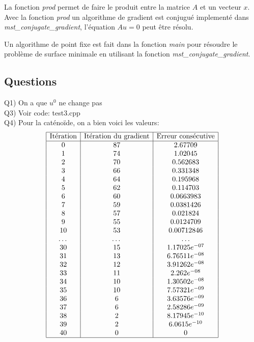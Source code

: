 \documentclass[a4paper, 11pt]{article}
\begin{document}
La fonction \textit{prod} permet de faire le produit entre la matrice $A$ et un
 vecteur $x$. Avec la fonction \textit{prod} un algorithme de gradient
 est conjugu\'e implement\'e dans \textit{mst\_conjugate\_gradient},
 l'\'equation $Au=0$ peut \^etre r\'esolu.

Un algorithme de point fixe est fait
 dans la fonction \textit{main} pour r\'esoudre le probl\`eme de surface
 minimale en utilisant la fonction \textit{mst\_conjugate\_gradient}.

\newpage

\subsection{Questions}
Q1) On a que $u^0$ ne change pas \\

Q3) Voir code: test3.cpp \\

Q4) Pour la cat\'eno\"ide, on a bien voici les valeurs: \\

$$
\begin{array}{|c|c|c|}
\hline
\text{It\'eration} & \text{It\'eration du gradient} & \text{Erreur cons\'ecutive}
 \\
\hline
0 & 87 & 2.67709 \\
1 & 74 & 1.02045 \\
2 & 70 & 0.562683 \\
3 & 66 & 0.331348 \\
4 & 64 & 0.195968 \\
5 & 62 & 0.114703 \\
6 & 60 & 0.0663983 \\
7 & 59 & 0.0381426 \\
8 & 57 & 0.021824 \\
9 & 55 & 0.0124709 \\
10 & 53 & 0.00712846 \\
\dots & \dots & \dots \\
30 & 15 & 1.17025e^{-07} \\
31 & 13 & 6.76511e^{-08} \\
32 & 12 & 3.91262e^{-08} \\
33 & 11 & 2.262e^{-08} \\
34 & 10 & 1.30502e^{-08} \\
35 & 10 & 7.57321e^{-09} \\
36 & 6 & 3.63576e^{-09} \\
37 & 6 & 2.58286e^{-09} \\
38 & 2 & 8.17945e^{-10} \\
39 & 2 & 6.0615e^{-10} \\
40 & 0 & 0 \\
\hline
\end{array}
$$
\end{document}
